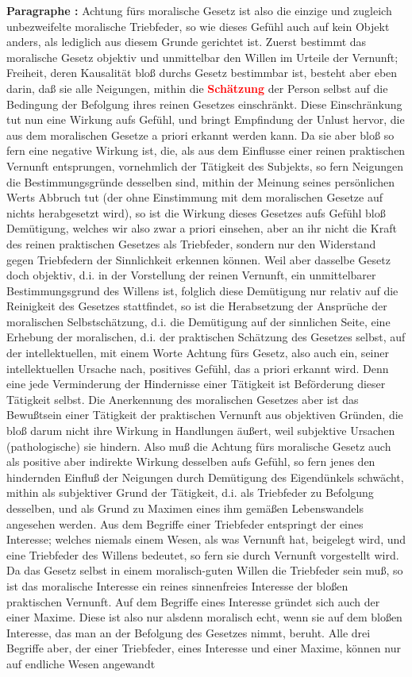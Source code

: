 \documentclass[a4paper,12pt,twoside]{book}
\newcommand{\match}[1]{\textcolor{red}{\textbf{#1}}}
\begin{document}
	\textbf{Paragraphe : }Achtung fürs moralische Gesetz ist also die einzige und zugleich unbezweifelte moralische Triebfeder, so wie dieses Gefühl auch auf kein Objekt anders, als lediglich aus diesem Grunde gerichtet ist. Zuerst bestimmt das moralische Gesetz objektiv und unmittelbar den Willen im Urteile der Vernunft; Freiheit, deren Kausalität bloß durchs Gesetz bestimmbar ist, besteht aber eben darin, daß sie alle Neigungen, mithin die \match{Schätzung} der Person selbst auf die Bedingung der Befolgung ihres reinen Gesetzes einschränkt. Diese Einschränkung tut nun eine Wirkung aufs Gefühl, und bringt Empfindung der Unlust hervor, die aus dem moralischen Gesetze a priori erkannt werden kann. Da sie aber  bloß so fern eine negative Wirkung ist, die, als aus dem Einflusse einer reinen praktischen Vernunft entsprungen, vornehmlich der Tätigkeit des Subjekts, so fern Neigungen die Bestimmungsgründe desselben sind, mithin der Meinung seines persönlichen Werts Abbruch tut (der ohne Einstimmung mit dem moralischen Gesetze auf nichts herabgesetzt wird), so ist die Wirkung dieses Gesetzes aufs Gefühl bloß Demütigung, welches wir also zwar a priori einsehen, aber an ihr nicht die Kraft des reinen praktischen Gesetzes als Triebfeder, sondern nur den Widerstand gegen Triebfedern der Sinnlichkeit erkennen können. Weil aber dasselbe Gesetz doch objektiv, d.i. in der Vorstellung der reinen Vernunft, ein unmittelbarer Bestimmungsgrund des Willens ist, folglich diese Demütigung nur relativ auf die Reinigkeit des Gesetzes stattfindet, so ist die Herabsetzung der Ansprüche der moralischen Selbstschätzung, d.i. die Demütigung auf der sinnlichen Seite, eine Erhebung der moralischen, d.i. der praktischen Schätzung des Gesetzes selbst, auf der intellektuellen, mit einem Worte Achtung fürs Gesetz, also auch ein, seiner intellektuellen Ursache nach, positives Gefühl, das a priori erkannt wird. Denn eine jede Verminderung der Hindernisse einer Tätigkeit ist Beförderung dieser Tätigkeit selbst. Die Anerkennung des moralischen Gesetzes aber ist das Bewußtsein einer Tätigkeit der praktischen Vernunft aus objektiven Gründen, die bloß darum nicht ihre Wirkung in Handlungen äußert, weil subjektive Ursachen (pathologische) sie hindern. Also muß die Achtung fürs moralische Gesetz auch als positive aber indirekte Wirkung desselben aufs Gefühl, so fern jenes den hindernden Einfluß der Neigungen durch Demütigung des Eigendünkels schwächt, mithin als subjektiver Grund der Tätigkeit, d.i. als Triebfeder zu Befolgung desselben, und als Grund zu Maximen eines ihm gemäßen Lebenswandels angesehen werden. Aus dem Begriffe einer Triebfeder entspringt der eines Interesse; welches niemals einem Wesen, als was Vernunft hat, beigelegt wird, und eine Triebfeder des Willens bedeutet, so fern sie durch Vernunft vorgestellt wird. Da das Gesetz selbst in einem moralisch-guten Willen die Triebfeder  sein muß, so ist das moralische Interesse ein reines sinnenfreies Interesse der bloßen praktischen Vernunft. Auf dem Begriffe eines Interesse gründet sich auch der einer Maxime. Diese ist also nur alsdenn moralisch echt, wenn sie auf dem bloßen Interesse, das man an der Befolgung des Gesetzes nimmt, beruht. Alle drei Begriffe aber, der einer Triebfeder, eines Interesse und einer Maxime, können nur auf endliche Wesen angewandt 
\end{document}
